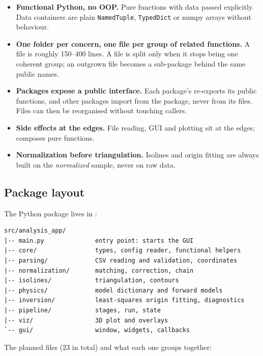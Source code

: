 \documentclass{article}
\begin{document}
\begin{itemize}
\item \textbf{Functional Python, no OOP.} Pure functions with data passed
      explicitly. Data containers are plain \texttt{NamedTuple},
      \texttt{TypedDict} or numpy arrays without behaviour.
\item \textbf{One folder per concern, one file per group of related
      functions.} A file is roughly 150--400 lines. A file is split only when
      it stops being one coherent group; an outgrown file becomes a
      sub-package behind the same public names.
\item \textbf{Packages expose a public interface.} Each package's
       re-exports its public functions, and other packages
      import from the package, never from its files. Files can then be
      reorganised without touching callers.
\item \textbf{Side effects at the edges.} File reading, GUI and plotting sit
      at the edges;  composes pure functions.
\item \textbf{Normalization before triangulation.} Isolines and origin fitting
      are always built on the \emph{normalized} sample, never on raw data.
\end{itemize}

\subsection{Package layout}
\label{sec:layout}

The Python package lives in :

\begin{lstlisting}
src/analysis_app/
|-- main.py              entry point: starts the GUI
|-- core/                types, config reader, functional helpers
|-- parsing/             CSV reading and validation, coordinates
|-- normalization/       matching, correction, chain
|-- isolines/            triangulation, contours
|-- physics/             model dictionary and forward models
|-- inversion/           least-squares origin fitting, diagnostics
|-- pipeline/            stages, run, state
|-- viz/                 3D plot and overlays
`-- gui/                 window, widgets, callbacks
\end{lstlisting}

The planned files (23 in total) and what each one groups together:
\end{document}
